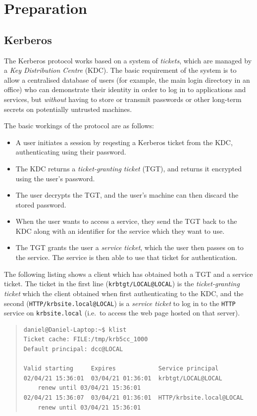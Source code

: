 \documentclass{article}
\begin{document}
\section{Preparation}

\subsection{Kerberos}
The Kerberos protocol works based on a system of \textit{tickets}, which are managed by a \textit{Key Distribution Centre} (KDC). The basic requirement of the system is to allow a centralised database of users (for example, the main login directory in an office) who can demonstrate their identity in order to log in to applications and services, but \textit{without} having to store or transmit passwords or other long-term secrets on potentially untrusted machines.

The basic workings of the protocol are as follows:

\begin{itemize}
\item
  A user initiates a session by reqesting a Kerberos ticket from the KDC, authenticating using their password.
\item
  The KDC returns a \textit{ticket-granting ticket} (TGT), and returns it encrypted using the user's password.
\item
  The user decrypts the TGT, and the user's machine can then discard the stored password.
\item
  When the user wants to access a service, they send the TGT back to the KDC along with an identifier for the service which they want to use.
\item
  The TGT grants the user a \textit{service ticket}, which the user then passes on to the service. The service is then able to use that ticket for authentication.
\end{itemize}

The following listing shows a client which has obtained both a TGT and a service ticket. The ticket in the first line (\verb+krbtgt/LOCAL@LOCAL+) is the \textit{ticket-granting ticket} which the client obtained when first authenticating to the KDC, and the second (\verb+HTTP/krbsite.local@LOCAL+) is a \textit{service ticket} to log in to the \verb+HTTP+ service on \verb+krbsite.local+ (i.e.\ to access the web page hosted on that server).

\begin{quote}
\begin{verbatim}
daniel@Daniel-Laptop:~$ klist
Ticket cache: FILE:/tmp/krb5cc_1000
Default principal: dcc@LOCAL

Valid starting     Expires            Service principal
02/04/21 15:36:01  03/04/21 01:36:01  krbtgt/LOCAL@LOCAL
	renew until 03/04/21 15:36:01
02/04/21 15:36:07  03/04/21 01:36:01  HTTP/krbsite.local@LOCAL
	renew until 03/04/21 15:36:01
\end{verbatim}
\end{quote}
\end{document}
